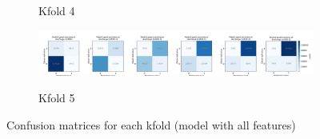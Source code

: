 \begin{figure}[!h]
\begin{subfigure}[b]{1\textwidth}
      \caption{Kfold 4}
      \label{fig:results_waterfall}
    \end{subfigure}
    \hfill
    \begin{subfigure}[b]{1\textwidth}
      \centering
      \includegraphics[width=1\textwidth]{./images/073_xgb_all_features_5fold_binary_confusion_matrices_per_binary_threshold_kfold4}\\
      \caption{Kfold 5}
      \label{fig:results_waterfall}
    \end{subfigure}
  \caption{Confusion matrices for each kfold (model with all features)}
\end{figure}

